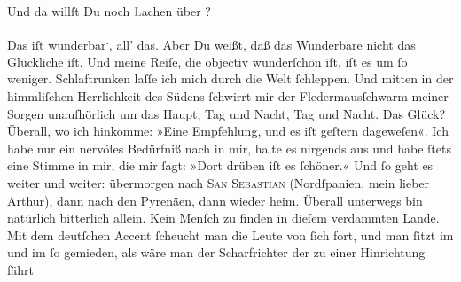                Und da willſt Du noch \textcolor{gray}{L}achen über \label{K_L02701-3v}\label{K_L02701-3}?\pend
           
\pstart
           Das iſt wunderbar\substVorne{}\textsuperscript{.}\substDazwischen{},\substHinten{} all’ das. Aber Du {\pb}weißt, daß das
               Wunderbare nicht das Glückliche iſt. Und meine Reiſe, die objectiv wunderſchön iſt,
               iſt es \label{T_L02701-1v}\label{T_L02701-1} um{ }ſo weniger. Schlaftrunken laſſe ich mich durch die Welt{ }ſchleppen. Und mitten in\strikeout{\textcolor{gray}{s}} der himmliſchen Herrlichkeit des Südens{ }ſchwirrt mir der Fledermausſchwarm
               meiner Sorgen unaufhörlich um das Haupt, Tag und Nacht, Tag und Nacht. Das Glück?
               Überall, wo ich hinkomme: »Eine Empfehlung, {\pb}und es
               iſt geſtern dageweſen«. Ich habe nur ein nervöſes Bedürfniß nach \label{K_L02701-4v}\label{K_L02701-4} in mir, halte es
               nirgends aus und habe{ }ſtets eine Stimme in mir, die mir{ }ſagt: »Dort drüben iſt es{ }ſchöner.« Und{ }ſo geht es weiter und weiter: übermorgen
               nach \textsc{San Sebastian} (Nordſpanien, mein lieber Arthur), dann
               nach den Pyrenäen, dann wieder heim. Überall
               unterwegs bin natürlich {\pb}bitterlich allein. Kein
               Menſch zu finden in dieſem verdammten Lande. Mit dem deutſchen Accent{ }ſcheucht man
               die Leute von{ }ſich fort,  und man{ }ſitzt im \label{K_L02701-5v}\label{K_L02701-5} und im \label{T_L02701-2v}\label{T_L02701-2}{ }ſo
               gemieden, als wäre man der Scharfrichter der zu einer Hinrichtung fährt{\dotsfour}\pend
           
